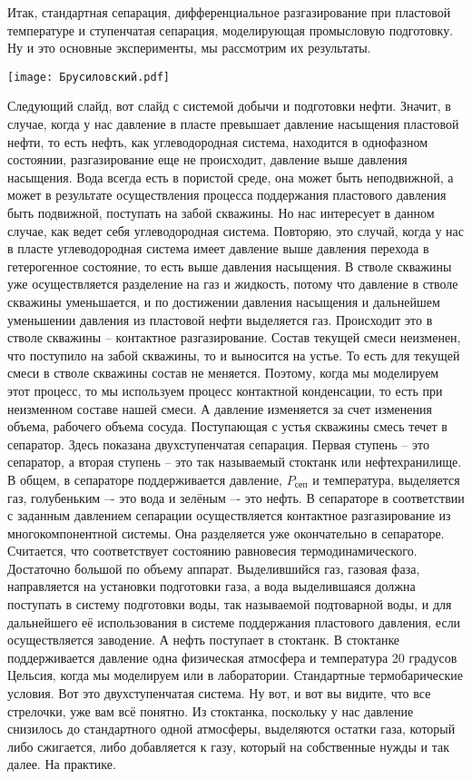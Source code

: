 \documentclass[main.tex]{subfiles}
\begin{document}
Итак, стандартная сепарация, дифференциальное разгазирование при пластовой температуре и ступенчатая сепарация, моделирующая промысловую подготовку.
Ну и это основные эксперименты, мы рассмотрим их результаты.

\begin{center}
\texttt{[image: Брусиловский.pdf]}
\end{center}

Следующий слайд, вот слайд с системой добычи и подготовки нефти.
Значит, в случае, когда у нас давление в пласте превышает давление насыщения пластовой нефти, то есть нефть, как углеводородная система, находится в однофазном состоянии, разгазирование еще не происходит, давление выше давления насыщения.
Вода всегда есть в пористой среде, она может быть неподвижной, а может в результате осуществления процесса поддержания пластового давления быть подвижной, поступать на забой скважины.
Но нас интересует в данном случае, как ведет себя углеводородная система.
Повторяю, это случай, когда у нас в пласте углеводородная система имеет давление выше давления перехода в гетерогенное состояние, то есть выше давления насыщения.
В стволе скважины уже осуществляется разделение на газ и жидкость, потому что давление в стволе скважины уменьшается, и по достижении давления насыщения и дальнейшем уменьшении давления из пластовой нефти выделяется газ.
Происходит это в стволе скважины -- контактное разгазирование.
Состав текущей смеси неизменен, что поступило на забой скважины, то и выносится на устье.
То есть для текущей смеси в стволе скважины состав не меняется.
Поэтому, когда мы моделируем этот процесс, то мы используем процесс контактной конденсации, то есть при неизменном составе нашей смеси.
А давление изменяется за счет изменения объема, рабочего объема сосуда.
Поступающая с устья скважины смесь течет в сепаратор.
Здесь показана двухступенчатая сепарация.
Первая ступень -- это сепаратор, а вторая ступень -- это так называемый стоктанк или нефтехранилище.
В общем, в сепараторе поддерживается давление, $P_{\text{сеп}}$ и температура, выделяется газ, голубеньким –- это вода и зелёным –- это нефть.
В сепараторе в соответствии с заданным давлением сепарации осуществляется контактное разгазирование из многокомпонентной системы.
Она разделяется уже окончательно в сепараторе.
Считается, что соответствует состоянию равновесия термодинамического.
Достаточно большой по объему аппарат.
Выделившийся газ, газовая фаза, направляется на установки подготовки газа, а вода выделившаяся должна поступать в систему подготовки воды, так называемой подтоварной воды, и для дальнейшего её использования в системе поддержания пластового давления, если осуществляется заводение.
А нефть поступает в стоктанк.
В стоктанке поддерживается давление одна физическая атмосфера и температура 20 градусов Цельсия, когда мы моделируем или в лаборатории.
Стандартные термобарические условия.
Вот это двухступенчатая система.
Ну вот, и вот вы видите, что все стрелочки, уже вам всё понятно.
Из стоктанка, поскольку у нас давление снизилось до стандартного одной атмосферы, выделяются остатки газа, который либо сжигается, либо добавляется к газу, который на собственные нужды и так далее.
На практике.
\end{document}
